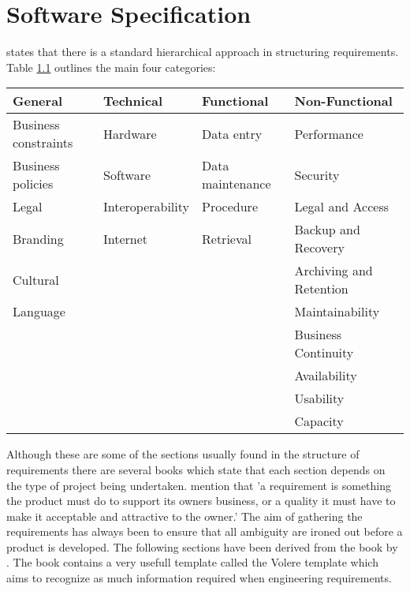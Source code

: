 \chapter{Software Specification} \label{chap:requirements} \citet{cadle10}
states that there is a standard hierarchical approach in  structuring
requirements. Table \ref{table:requirementsCategories} outlines the main four
categories:

\begin{table}[H]   \begin{tabular}{|l|l|l|l|}     \hline     {\bf General} &
{\bf Technical} & {\bf Functional} & {\bf Non-Functional} \\      \hline
Business constraints & Hardware & Data entry & Performance \\      Business
policies & Software & Data maintenance & Security \\      Legal &
Interoperability & Procedure & Legal and Access \\      Branding & Internet &
Retrieval & Backup and Recovery \\      Cultural & ~ & ~ & Archiving and
Retention \\      Language & ~ & ~ & Maintainability \\      ~ & ~ & ~ &
Business Continuity \\      ~ & ~ & ~ & Availability \\      ~ & ~ & ~ &
Usability \\      ~ & ~ & ~ & Capacity \\     \hline   \end{tabular}
\label{table:requirementsCategories} \end{table}


Although these are some of the sections usually found in the structure of
requirements there are several books which state that each section depends on
the type of project being undertaken. \citet{robertson13} mention that 'a
requirement is something the product must do to support its owners business, or
a quality it must have to make it acceptable and attractive to the owner.' The
aim of gathering the requirements has always been to ensure that all ambiguity
are ironed out before a product is developed. The following sections have been
derived from the book by \citep{robertson13}. The book contains a very usefull
template called the Volere template which aims to recognize as much information
required when engineering requirements.


\newpage


